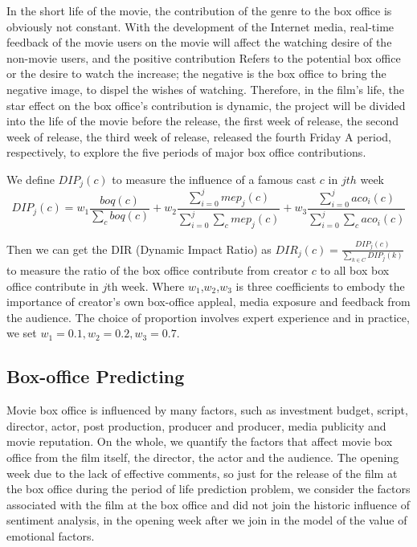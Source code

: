 \par In the short life of the movie, the contribution of the genre to the box office is obviously not constant. With the development of the Internet media, real-time feedback of the movie users on the movie will affect the watching desire of the non-movie users, and the positive contribution Refers to the potential box office or the desire to watch the increase; the negative is the box office to bring the negative image, to dispel the wishes of watching. Therefore, in the film's life, the star effect on the box office's contribution is dynamic, the project will be divided into the life of the movie before the release, the first week of release, the second week of release, the third week of release, released the fourth Friday A period, respectively, to explore the five periods of major box office contributions.
\par We define $DIP_j(c)$ to measure the influence of a famous cast $c$ in $jth$ week
\begin{equation}
DIP_j(c)=w_1\frac{boq(c)}{\sum_{c}boq(c)}+w_2\frac{\sum_{i=0}^{j}mep_j(c)}{\sum_{i=0}^{j}\sum_{c}mep_j(c)}+w_3\frac{\sum_{i=0}^{j}aco_i(c)}{\sum_{i=0}^{j}\sum_{c}aco_i(c)}
\end{equation}
\par Then we can get the DIR (Dynamic Impact Ratio) as $DIR_j(c)=\frac{DIP_j(c)}{\sum_{k\in C}DIP_j(k)}$ to measure the ratio of the box office contribute from creator $c$ to all box box office contribute in $j$th week. Where $w_1$,$w_2$,$w_3$ is three coefficients to embody the importance of creator's own box-office appleal, media exposure and feedback from the audience. The choice of proportion involves expert experience and in practice, we set $w_1=0.1,w_2=0.2,w_3=0.7$.

\subsection{Box-office Predicting}
Movie box office is influenced by many factors, such as investment budget, script, director, actor, post production, producer and producer, media publicity and movie reputation. On the whole, we quantify the factors that affect movie box office from the film itself, the director, the actor and the audience. The opening week due to the lack of effective comments, so just for the release of the film at the box office during the period of life prediction problem, we consider the factors associated with the film at the box office and did not join the historic influence of sentiment analysis, in the opening week after we join in the model of the value of emotional factors.

